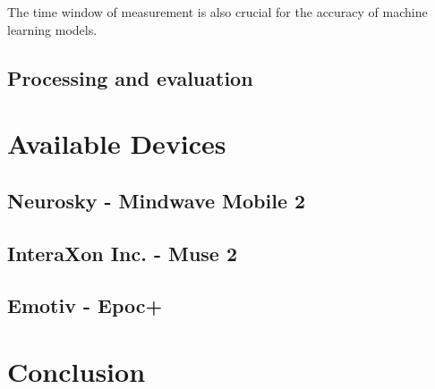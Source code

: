 \documentclass{llncs} %
\begin{document}
The time window of measurement is also crucial for the accuracy of machine learning models.
\subsection{Processing and evaluation}
\cite{Lotte}
\section{Available Devices}
\subsection{Neurosky - Mindwave Mobile 2}
\subsection{InteraXon Inc. - Muse 2}
\subsection{Emotiv - Epoc+}
\section{Conclusion}
\end{document}
